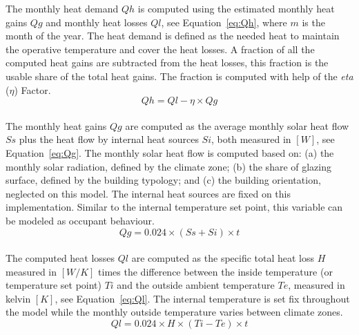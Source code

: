 \documentclass[runningheads,a4paper]{llncs}
\begin{document}
The monthly heat demand $Qh$ is computed using the estimated monthly heat gains
$Qg$ and monthly heat losses $Ql$, see Equation~\ref{eq:Qh}, where $m$ is the
month of the year.
The heat demand is defined as the needed heat to maintain the operative
temperature and cover the heat losses.
A fraction of all the computed heat gains are subtracted from the heat losses, 
this fraction is the usable share of the total heat gains. 
The fraction is computed with help of the \textit{eta} ($\eta$) Factor.\\

\begin{equation}\label{eq:Qh}
    Qh = Ql - \eta \times Qg
\end{equation}
\\

The monthly heat gains $Qg$ are computed as the average monthly solar heat flow
$Ss$ plus the heat flow by internal heat sources $Si$, both measured in $[W]$,
see Equation~\ref{eq:Qg}. The monthly solar heat flow is computed based on:
(a) the monthly solar radiation, defined by the climate zone; (b) the share of
glazing surface, defined by the building typology; and (c) the building
orientation, neglected on this model. The internal heat sources are fixed on
this implementation. Similar to the internal temperature set point, this
variable can be modeled as occupant behaviour.
\\

\begin{equation}\label{eq:Qg}
    Qg = 0.024 \times (Ss + Si) \times t
\end{equation}
\\

The computed heat losses $Ql$ are computed as the specific total heat loss
$H$ measured in $[W/K]$ times the difference between the inside temperature
(or temperature set point) $Ti$ and the outside ambient temperature $Te$,
measured in kelvin $[K]$, see Equation~\ref{eq:Ql}. The internal temperature is
set fix throughout the model while the monthly outside temperature varies
between climate zones.
\\

\begin{equation}\label{eq:Ql}
    Ql = 0.024 \times H \times \left(Ti-Te\right) \times t
\end{equation}
\\
\end{document}
